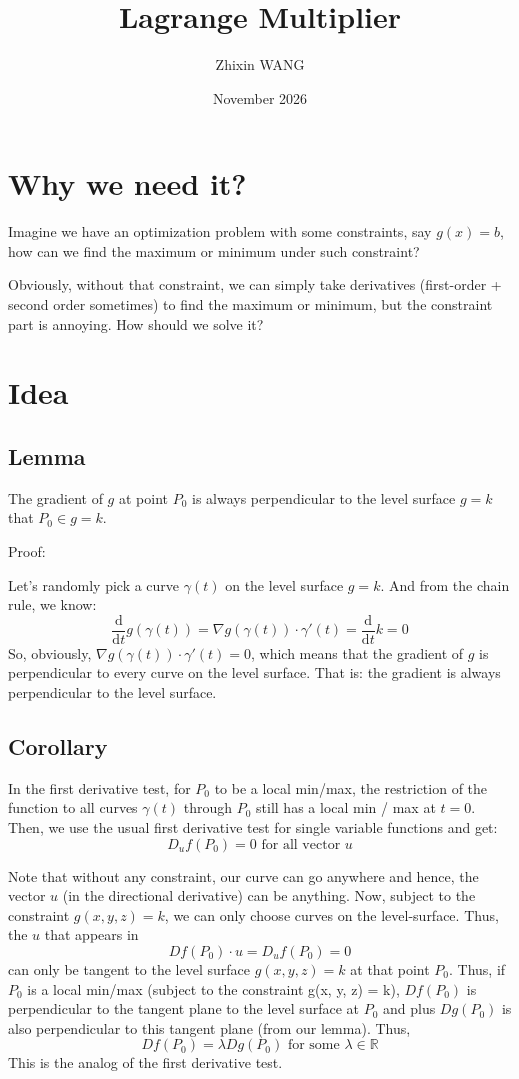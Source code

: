 \documentclass{article}
\title{Lagrange Multiplier}
\author{Zhixin WANG}
\date{November 2026}
\begin{document}
\maketitle

\section{Why we need it?}
Imagine we have an optimization problem with some constraints, say $g(x) = b$, how can we find the maximum or minimum under such constraint?

Obviously, without that constraint, we can simply take derivatives (first-order + second order sometimes) to find the maximum or minimum, but the constraint part is annoying. How should we solve it?

\section{Idea}

\subsection{Lemma}
The gradient of $g$ at point $P_{0}$ is always perpendicular to the level surface $g = k$ that $P_{0} \in g = k$.

Proof:

Let's randomly pick a curve $\gamma(t)$ on the level surface $g = k$. And from the chain rule, we know:
$$\frac{\mathrm{d}}{\mathrm{d}t} g(\gamma(t)) = \nabla g(\gamma(t)) \cdot \gamma'(t) = \frac{\mathrm{d}}{\mathrm{d}t} k = 0$$
So, obviously, $\nabla g(\gamma(t)) \cdot \gamma'(t) = 0$, which means that the gradient of $g$ is perpendicular to every curve on the level surface. That is: the gradient is always perpendicular to the level surface.

\subsection{Corollary}
In the first derivative test, for $P_{0}$ to be a local min/max, the restriction of the function to all curves $\gamma(t)$ through $P_{0}$ still has a local min / max at $t = 0$. Then, we use the usual first derivative test for single variable functions and get:
$$D_{u}f (P_0) = 0 \text{ for all vector } u$$

Note that without any constraint, our curve can go anywhere and hence, the vector $u$ (in the directional derivative) can be anything. Now, subject to the constraint $g(x, y, z) = k$, we can only choose curves on the level-surface. Thus, the $u$ that appears in
$$Df(P_0) \cdot u = D_{u}f(P_0) = 0$$
can only be tangent to the level surface $g(x, y, z) = k$ at that point $P_0$. Thus, if $P_0$
is a local min/max (subject to the constraint g(x, y, z) = k), $D f (P_0)$ is perpendicular to the tangent plane to the level surface at $P_0$ and plus $Dg(P_0)$ is also perpendicular to this tangent plane (from our lemma). Thus, 
$$D f (P_0) = \lambda Dg(P_0) \text{ for some } \lambda \in \mathbb{R}$$
This is the analog of the first derivative test.
\end{document}
